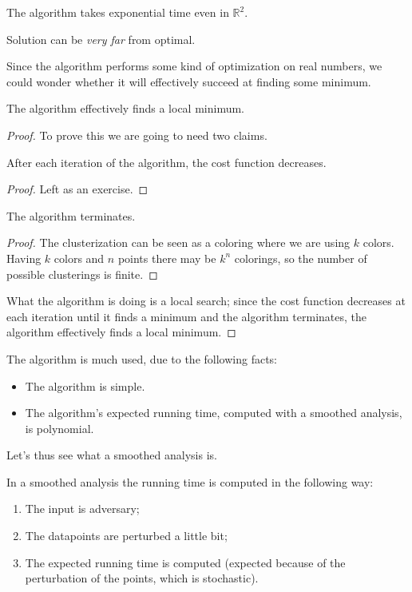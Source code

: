 \begin{obs}
    The algorithm takes exponential time even in $\mathbb{R}^2$.
\end{obs}
\begin{obs}
    Solution can be \emph{very far} from optimal.
\end{obs}

Since the algorithm performs some kind of optimization on real numbers, we could wonder whether it will effectively succeed at finding some minimum.
\begin{thm}
    The algorithm effectively finds a local minimum.
\end{thm}
\begin{proof}
    To prove this we are going to need two claims.
    \begin{claim}
        After each iteration of the algorithm, the cost function decreases.
    \end{claim}
    \begin{proof}
        Left as an exercise.
    \end{proof}
    \begin{claim}
        The algorithm terminates.
    \end{claim}
    \begin{proof}
        The clusterization can be seen as a coloring where we are using $k$ colors.
        Having $k$ colors and $n$ points there may be $k^n$ colorings, so the number of possible clusterings is finite.
    \end{proof}
    What the algorithm is doing is a local search; since the cost function decreases at each iteration until it finds a minimum and the algorithm terminates, the algorithm effectively finds a local minimum.
\end{proof}

The algorithm is much used, due to the following facts:
\begin{itemize}
    \item The algorithm is simple.
    \item The algorithm's expected running time, computed with a smoothed analysis, is polynomial.
\end{itemize}
%
Let's thus see what a smoothed analysis is.
%
\begin{defn}
    In a smoothed analysis the running time is computed in the following way:
    \begin{enumerate}
        \item The input is adversary;
        \item The datapoints are perturbed a little bit;
        \item The expected running time is computed (expected because of the perturbation of the points, which is stochastic).
    \end{enumerate}
\end{defn}

